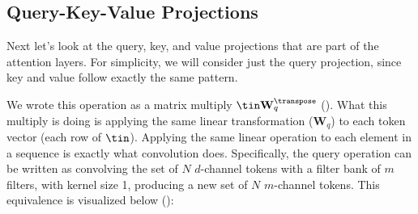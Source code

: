 \subsection{Query-Key-Value Projections}

Next let's look at the query, key, and value projections that are part of the attention layers. For simplicity, we will consider just the query projection, since key and value follow exactly the same pattern.

We wrote this operation as a matrix multiply $\tin \mathbf{W}_q^\transpose$ (\eqn{\ref{eqn:transformers:query_matrix}}). What this multiply is doing is applying the same linear transformation ($\mathbf{W}_q$) to each token vector (each row of $\tin$). Applying the same linear operation to each element in a sequence is exactly what convolution does. Specifically, the query operation can be written as convolving the set of $N$ $d$-channel tokens with a filter bank of $m$ filters, with kernel size 1, producing a new set of $N$ $m$-channel tokens. This equivalence is visualized below (\fig{\ref{fig:transformers:conv_matmul_equivalence}}):
